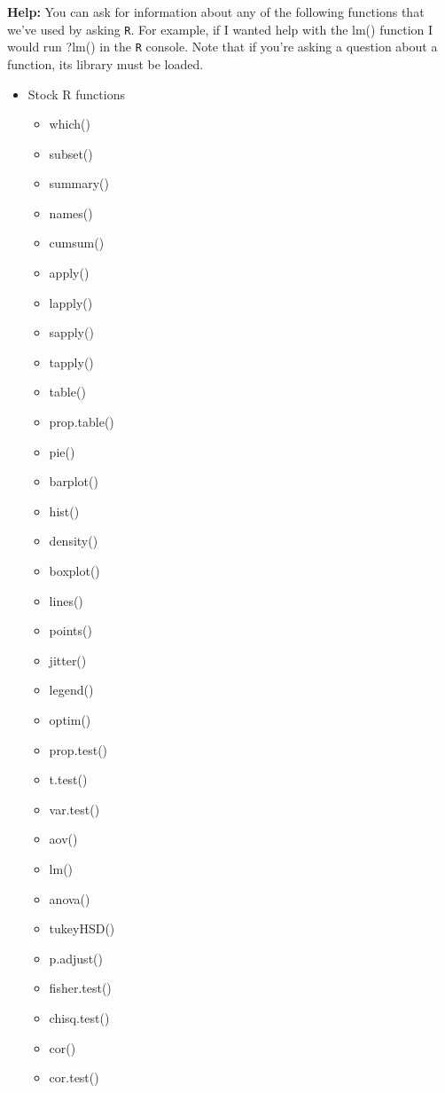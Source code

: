 \documentclass{article}
\begin{document}
\textbf{Help:}
You can ask for information about any of the following functions that we've used by
asking \texttt{R}. For example, if I wanted help with the lm() function I would 
run ?lm() in the \texttt{R} console. Note that if you're asking a question about 
a function, its library must be loaded.\\
\begin{multicols}{3} \small
\begin{itemize}
  \item Stock R functions
  \begin{itemize}
    \item which()
    \item subset()
    \item summary()
    \item names()
    \item cumsum()
    \item apply()
    \item lapply()
    \item sapply()
    \item tapply()
    \item table()
    \item prop.table()
    \item pie()
    \item barplot()
    \item hist()
    \item density()
    \item boxplot()
    \item lines()
    \item points()
    \item jitter()
    \item legend()
    \item optim()
    \item prop.test()
    \item t.test()
    \item var.test()
    \item aov()
    \item lm()
    \item anova()
    \item tukeyHSD()
    \item p.adjust()
    \item fisher.test()
    \item chisq.test()
    \item cor()
    \item cor.test()
  \end{itemize}

\end{itemize}
\end{multicols}
\end{document}
